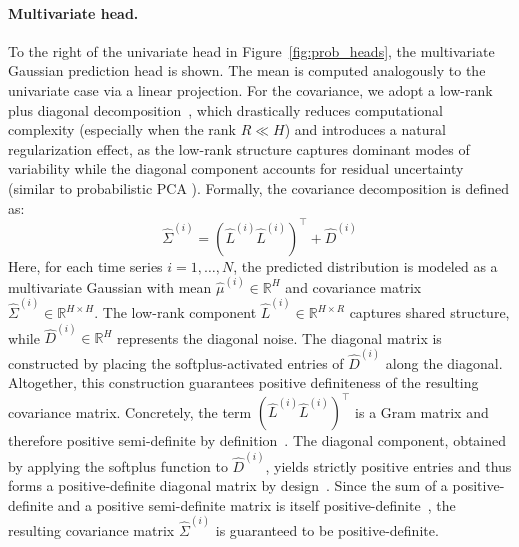 \documentclass[a4paper,oneside,bibliography=totoc]{scrbook}
\begin{document}
\paragraph{Multivariate head.}
To the right of the univariate head in Figure~\ref{fig:prob_heads}, the multivariate Gaussian prediction head is shown. 
The mean is computed analogously to the univariate case via a linear projection. For the covariance, we adopt a low-rank plus diagonal decomposition~\cite{wu_high-dimensional_2020}, which drastically reduces computational complexity (especially when the rank \( R \ll H \)) and introduces a natural regularization effect, as the low-rank structure captures dominant modes of variability while the diagonal component accounts for residual uncertainty (similar to probabilistic PCA \cite{tipping_probabilistic_1999}).
Formally, the covariance decomposition is defined as:
\begin{equation}
\hat{\Sigma}^{(i)} = (\hat{L}^{(i)} {\hat{L}^{(i)}})^\top + \hat{D}^{(i)}
\label{eq:multivariate_cov}
\end{equation}
Here, for each time series $i=1,\dots,N$, the predicted distribution is modeled as a multivariate Gaussian with mean $\hat{\mu}^{(i)} \in \mathbb{R}^H$ and covariance matrix $\hat{\Sigma}^{(i)}\in \mathbb{R}^{H\times H}$. 
The low-rank component $\hat{L}^{(i)} \in \mathbb{R}^{H\times R}$ captures shared structure, while $\hat{D}^{(i)} \in \mathbb{R}^{H}$ represents the diagonal noise. 
The diagonal matrix is constructed by placing the softplus-activated entries of $\hat{D}^{(i)}$ along the diagonal. 
Altogether, this construction guarantees positive definiteness of the resulting covariance matrix. Concretely, the term $(\hat{L}^{(i)} {\hat{L}^{(i)}})^\top$ is a Gram matrix and therefore positive semi-definite by definition~\cite[Observation 7.2.10]{horn_chapter_2012}. The diagonal component, obtained by applying the softplus function to $\hat{D}^{(i)}$, yields strictly positive entries and thus forms a positive-definite diagonal matrix by design~\cite{horn_chapter_2012}. Since the sum of a positive-definite and a positive semi-definite matrix is itself positive-definite~\cite[Observation 7.1.3]{horn_chapter_2012}, the resulting covariance matrix $\hat{\Sigma}^{(i)}$ is guaranteed to be positive-definite.
\end{document}
